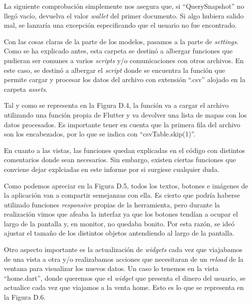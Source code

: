 	La siguiente comprobación simplemente nos asegura que, si ``QuerySnapshot'' no llegó vacío, devuelva el valor \emph{wallet} del primer documento. Si algo hubiera salido mal, se lanzaría una excepción especificando que el usuario no fue encontrado.
	
	Con las cosas claras de la parte de los modelos, pasamos a la parte de \emph{settings}. Como se ha explicado antes, esta carpeta se destinó a albergar funciones que pudieran ser comunes a varios \emph{scripts} y/o comunicaciones con otros archivos. En este caso, se destinó a albergar el \emph{script} donde se encuentra la función que permite cargar y procesar los datos del archivo con extensión ``.csv'' alojado en la carpeta \emph{assets}.
	
	Tal y como se representa en la Figura D.4, la función va a cargar el archivo utilizando una función propia de Flutter y va devolver una lista de mapas con los datos procesados. Es importante tener en cuenta que la primera fila del archivo son los encabezados, por lo que se indica con ``csvTable.skip(1)''. 
	

	En cuanto a las vistas, las funciones quedan explicadas en el código con distintos comentarios donde sean necesarios. Sin embargo, existen ciertas funciones que conviene dejar explciadas en este informe por si surgiese cualquier duda.
	
	Como podemos apreciar en la Figura D.5, todos los textos, botones e imágenes de la aplicación van a compartir semejanzas con ella. Es cierto que podría haberse utilizado funciones \emph{responsive} propias de la herramienta, pero durante la realización vimos que afeaba la interfaz ya que los botones tendían a ocupar el largo de la pantalla y, en monitor, no quedaba bonito. Por esta razón, se ideó ajustar el tamaño de los distintos objetos antendiendo al largo de la pantalla.
	

	Otro aspecto importante es la actualización de \emph{widgets} cada vez que viajabamos de una vista a otra y/o realizabamos acciones que necesitaran de un \emph{reload} de la ventana para visualizar los nuevos datos. Un caso lo tenemos en la vista ``home.dart'', donde queremos que el \emph{widget} que presenta el dinero del usuario, se actualice cada vez que viajamos a la venta home. Esto es lo que se representa en la Figura D.6. 

